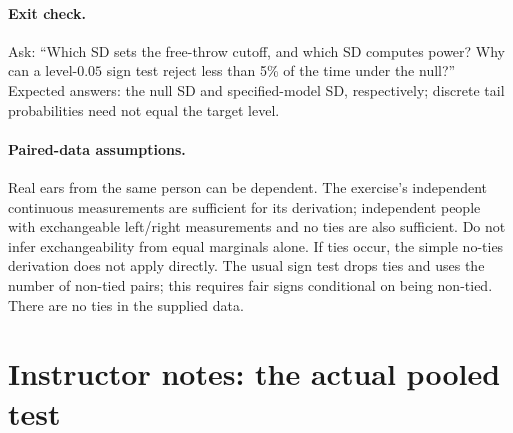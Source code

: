 \documentclass[11pt]{article}
\begin{document}
\paragraph{Exit check.}
Ask: ``Which SD sets the free-throw cutoff, and which SD computes power?
Why can a level-$0.05$ sign test reject less than 5\% of the time under
the null?'' Expected answers: the null SD and specified-model SD,
respectively; discrete tail probabilities need not equal the target level.

\paragraph{Paired-data assumptions.}
Real ears from the same person can be dependent. The exercise's independent
continuous measurements are sufficient for its derivation; independent
people with exchangeable left/right measurements and no ties are also
sufficient. Do not infer exchangeability from equal marginals alone.
If ties occur, the simple no-ties derivation does not apply directly.
The usual sign test drops ties and uses the number of non-tied pairs;
this requires fair signs conditional on being non-tied. There are no ties
in the supplied data.

\newpage
\section*{Instructor notes: the actual pooled test}
\end{document}
